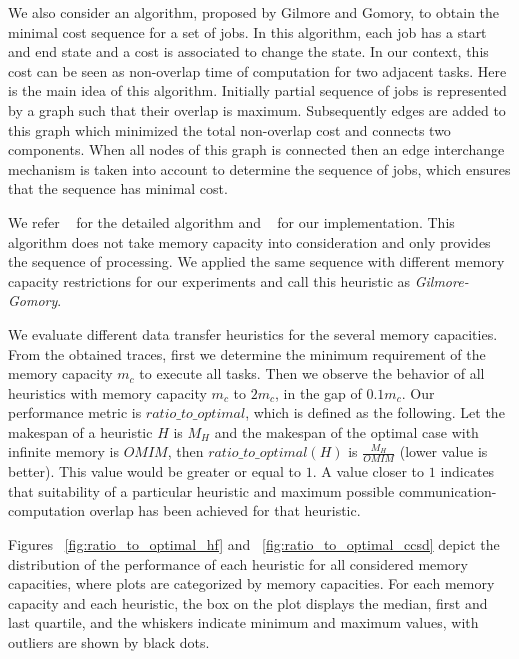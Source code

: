 \documentclass[runningheads]{llncs} %
\begin{document}
	We also consider an algorithm, proposed by Gilmore and Gomory, to obtain the minimal cost sequence for a set of jobs. In this algorithm, each job has a start and end state and a cost is associated to change the state. In our context, this cost can be seen as non-overlap time of computation for two adjacent tasks. Here is the main idea of this algorithm. Initially partial sequence of jobs is represented by a graph such that their overlap is maximum. Subsequently edges are added to this graph which minimized the total non-overlap cost  and connects two components. When all nodes of this graph is connected then an edge interchange mechanism is taken into account to determine the sequence of jobs, which ensures that the sequence has minimal cost.
	
	We refer ~\cite{Gilmore-Gomory:1964} for the detailed algorithm and ~\cite{gitworkrepo} for our implementation. This algorithm does not take memory capacity into consideration and only provides the sequence of processing. We applied the same sequence with different memory capacity restrictions for our experiments and call this heuristic as \textit{Gilmore-Gomory}.
	
	
	
	We evaluate different data transfer heuristics for the several memory capacities. From the obtained traces, first we determine the minimum requirement of the memory capacity $m_c$ to execute all tasks. Then we observe the behavior of all heuristics with memory capacity  $m_c$ to $2m_c$, in the gap of $0.1m_c$. Our performance metric is $ratio\_to\_optimal$, which is defined as the following. Let the makespan of a heuristic $H$ is $M_H$ and the makespan of the optimal  case with infinite memory is $OMIM$, then  $ratio\_to\_optimal (H)$ is $\frac{M_H}{OMIM}$ (lower value is better). This value would be  greater or equal to $1$. A value closer to $1$ indicates that suitability of a particular heuristic and maximum possible communication-computation overlap has been achieved for that heuristic.
	
	
	Figures ~\ref{fig:ratio_to_optimal_hf} and ~\ref{fig:ratio_to_optimal_ccsd} depict the distribution of the performance  of each heuristic for all considered memory capacities, where plots are categorized by memory capacities. For each memory capacity and each heuristic, the box on the plot displays the median, first and last quartile, and the whiskers indicate minimum and maximum values, with outliers are shown by black dots.
\end{document}
